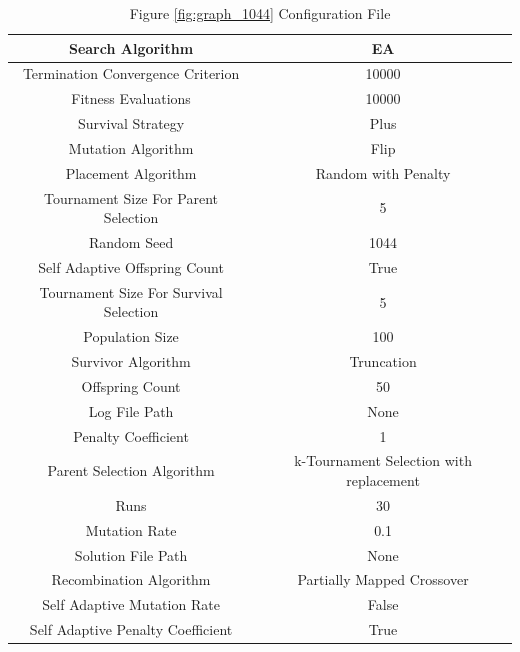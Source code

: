 \documentclass{standalone}
\begin{document}
\begin{table}[!htb]
	\centering
	\caption{Figure \ref{fig:graph_1044} Configuration File}
	\label{tab:graph_1044}
	\begin{tabular}{| c | c |}
		\hline
		Search Algorithm		& EA		 \\
		\hline
		Termination Convergence Criterion		& 10000		 \\
		\hline
		Fitness Evaluations		& 10000		 \\
		\hline
		Survival Strategy		& Plus		 \\
		\hline
		Mutation Algorithm		& Flip		 \\
		\hline
		Placement Algorithm		& Random with Penalty		 \\
		\hline
		Tournament Size For Parent Selection		& 5		 \\
		\hline
		Random Seed		& 1044		 \\
		\hline
		Self Adaptive Offspring Count		& True		 \\
		\hline
		Tournament Size For Survival Selection		& 5		 \\
		\hline
		Population Size		& 100		 \\
		\hline
		Survivor Algorithm		& Truncation		 \\
		\hline
		Offspring Count		& 50		 \\
		\hline
		Log File Path		& None		 \\
		\hline
		Penalty Coefficient		& 1		 \\
		\hline
		Parent Selection Algorithm		& k-Tournament Selection with replacement		 \\
		\hline
		Runs		& 30		 \\
		\hline
		Mutation Rate		& 0.1		 \\
		\hline
		Solution File Path		& None		 \\
		\hline
		Recombination Algorithm		& Partially Mapped Crossover		 \\
		\hline
		Self Adaptive Mutation Rate		& False		 \\
		\hline
		Self Adaptive Penalty Coefficient		& True		 \\
		\hline
	\end{tabular}
\end{table}
\end{document}
